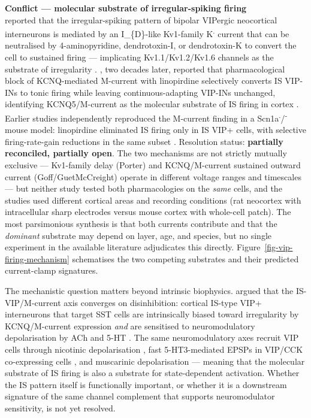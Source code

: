 \documentclass[11pt]{article}
\begin{document}
\begin{framed}
\textbf{Conflict --- molecular substrate of irregular-spiking firing}\\
\citet{Porter1998} reported that the irregular-spiking pattern of bipolar VIPergic neocortical interneurons is mediated by an I\_\{D\}-like Kv1-family K\textsuperscript{.} current that can be neutralised by 4-aminopyridine, dendrotoxin-I, or dendrotoxin-K to convert the cell to sustained firing --- implicating Kv1.1/Kv1.2/Kv1.6 channels as the substrate of irregularity \citep{Porter1998}. \citet{Goff2019}, two decades later, reported that pharmacological block of KCNQ-mediated M-current with linopirdine selectively converts IS VIP-INs to tonic firing while leaving continuous-adapting VIP-INs unchanged, identifying KCNQ5/M-current as the molecular substrate of IS firing in cortex \citep{Goff2019}. Earlier studies independently reproduced the M-current finding in a Scn1a\textsuperscript{.}/\textsuperscript{-} mouse model: linopirdine eliminated IS firing only in IS VIP+ cells, with selective firing-rate-gain reductions in the same subset \citep{Guetmccreight2020b}. Resolution status: \textbf{partially reconciled, partially open}. The two mechanisms are not strictly mutually exclusive --- Kv1-family delay (Porter) and KCNQ/M-current sustained outward current (Goff/GuetMcCreight) operate in different voltage ranges and timescales --- but neither study tested both pharmacologies on the \textit{same} cells, and the studies used different cortical areas and recording conditions (rat neocortex with intracellular sharp electrodes versus mouse cortex with whole-cell patch). The most parsimonious synthesis is that both currents contribute and that the \textit{dominant} substrate may depend on layer, age, and species, but no single experiment in the available literature adjudicates this directly. Figure~\ref{fig-vip-firing-mechanism} schematises the two competing substrates and their predicted current-clamp signatures.
\end{framed}

The mechanistic question matters beyond intrinsic biophysics. \citet{Guetmccreight2020b} argued that the IS-VIP/M-current axis converges on disinhibition: cortical IS-type VIP+ interneurons that target SST cells are intrinsically biased toward irregularity by KCNQ/M-current expression \textit{and} are sensitised to neuromodulatory depolarisation by ACh and 5-HT \citep{Guetmccreight2020b}. The same neuromodulatory axes recruit VIP cells through nicotinic depolarisation \citep{Porter1999, Bell2015, Tremblay2016}, fast 5-HT3-mediated EPSPs in VIP/CCK co-expressing cells \citep{Ferezou2002, Chen2015a}, and muscarinic depolarisation \citep{Tremblay2016} --- meaning that the molecular substrate of IS firing is also a substrate for state-dependent activation. Whether the IS pattern itself is functionally important, or whether it is a downstream signature of the same channel complement that supports neuromodulator sensitivity, is not yet resolved.
\end{document}
